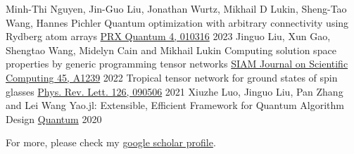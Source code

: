 \documentclass[11pt, a4paper]{awesome-cv}
\begin{document}
%
%
\begin{cventries}
  \cventry
    {Minh-Thi Nguyen, Jin-Guo Liu, Jonathan Wurtz, Mikhail D Lukin, Sheng-Tao Wang, Hannes Pichler} %
    {Quantum optimization with arbitrary connectivity using Rydberg atom arrays} %
    {\href{https://journals.aps.org/prxquantum/abstract/10.1103/PRXQuantum.4.010316}{PRX Quantum 4, 010316}} %
    {2023} %
    {
    }
  \cventry
    {Jinguo Liu, Xun Gao, Shengtao Wang, Midelyn Cain and Mikhail Lukin} %
    {Computing solution space properties by generic programming tensor networks} %
    {\href{https://epubs.siam.org/doi/full/10.1137/22M1501787}{SIAM Journal on Scientific Computing 45, A1239}} %
    {2022} %
    {}
  {Tropical tensor network for ground states of spin glasses}
    {\href{https://journals.aps.org/prl/abstract/10.1103/PhysRevLett.126.090506}{Phys. Rev. Lett. 126, 090506}}
  {2021}
  {
  }
  \cventry
    {Xiuzhe Luo, Jinguo Liu, Pan Zhang and Lei Wang} %
    {Yao.jl: Extensible, Efficient Framework for Quantum Algorithm Design} %
    {\href{https://quantum-journal.org/papers/q-2020-10-11-341/}{Quantum}} %
    {2020} %
    {
    }
\end{cventries}

For more, please check my \href{https://scholar.google.com/citations?view_op=list_works&hl=zh-CN&hl=zh-CN&user=4edw228AAAAJ&sortby=pubdate}{google scholar profile}.

\nocite{*} %

\begingroup %
\renewcommand{\section}[2]{}%

{}


\end{document}
